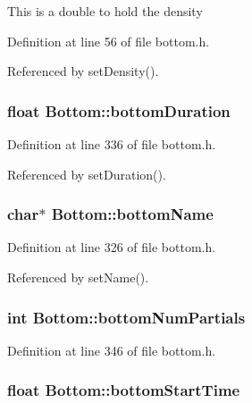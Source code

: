 This is a double to hold the density 

Definition at line 56 of file bottom.h.

Referenced by set\-Density().
\subsubsection{\setlength{\rightskip}{0pt plus 5cm}float {\bf Bottom::bottom\-Duration}\hspace{0.3cm}{\tt  [protected]}}\label{classBottom_p2}




Definition at line 336 of file bottom.h.

Referenced by set\-Duration().
\subsubsection{\setlength{\rightskip}{0pt plus 5cm}char$\ast$ {\bf Bottom::bottom\-Name}\hspace{0.3cm}{\tt  [protected]}}\label{classBottom_p0}




Definition at line 326 of file bottom.h.

Referenced by set\-Name().
\subsubsection{\setlength{\rightskip}{0pt plus 5cm}int {\bf Bottom::bottom\-Num\-Partials}\hspace{0.3cm}{\tt  [protected]}}\label{classBottom_p4}




Definition at line 346 of file bottom.h.
\subsubsection{\setlength{\rightskip}{0pt plus 5cm}float {\bf Bottom::bottom\-Start\-Time}\hspace{0.3cm}{\tt  [protected]}}\label{classBottom_p1}




